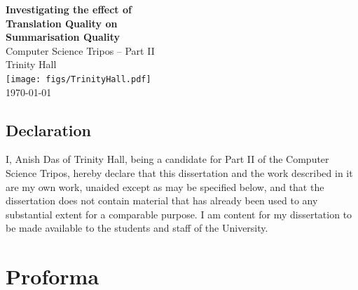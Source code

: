 \documentclass[12pt,a4paper,twoside,openright]{report}
\newcommand{\name}{Anish Das}
\begin{document}
 \renewcommand*{\thefootnote}{\arabic{footnote}}





\pagestyle{empty}

\rightline{\LARGE \textbf{\name}}

\thispagestyle{empty}
\vspace*{60mm}
\begin{center}
\Huge
\textbf{Investigating the effect of \\Translation Quality on \\Summarisation Quality}\\[5mm]
Computer Science Tripos -- Part II\\[5mm]
Trinity Hall \\[5mm]
\texttt{[image: figs/TrinityHall.pdf]}\\

\today  %
\end{center}



\pagestyle{plain}

\newpage
\setcounter{page}{1}
\section*{Declaration}

I, Anish Das of Trinity Hall, being a candidate for Part II of the Computer Science Tripos, hereby declare
that this dissertation and the work described in it are my own work,
unaided except as may be specified below, and that the dissertation
does not contain material that has already been used to any substantial
extent for a comparable purpose.
I am content for my dissertation to be made available to the students and staff of the University.

\bigskip
{}

\medskip
{}

\chapter*{Proforma}
\end{document}
